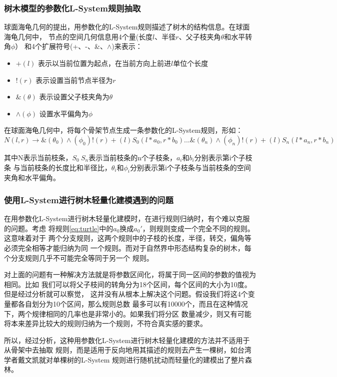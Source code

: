 \subsubsection{树木模型的参数化L-System规则抽取}
球面海龟几何的提出，用参数化的L-System规则描述了树木的结构信息。在球面海龟几何中，
节点的空间几何信息用4个量(长度$l$、半径$r$、父子枝夹角$\theta$和水平转角$\phi$）
和4个扩展符号(+、-、\&、$\wedge$)来表示：
\begin{itemize}
	\item $+(l)$	表示以当前位置为起点，在当前方向上前进$l$单位个长度
	\item $!(r)$	表示设置当前节点半径为$r$
	\item $\&(\theta)$	表示设置父子枝夹角为$\theta$
	\item $\wedge(\phi)$	设置水平偏角为$\phi$
\end{itemize}
在球面海龟几何中，将每个骨架节点生成一条参数化的L-System规则，形如：\\
\begin{equation} \label{eq:turtle}
N(l,r) \rightarrow \&(\theta_0)\wedge(\phi_0)!(r) + (l)S_0(l*a_0,r*b_0)...\&(\theta_n)\wedge(\phi_n)!(r) + (l)S_n(l*a_n,r*b_n)
\end{equation}

其中N表示当前枝条，$S_0~S_n$表示当前枝条的n个子枝条，$a_i和b_i$分别表示第i个子枝条
与当前枝条的长度比和半径比，$\theta_i和\phi_i$分别表示第i个子枝条与当前枝条的空间
夹角和水平偏角。

\subsubsection{使用L-System进行树木轻量化建模遇到的问题}
在用参数化L-System进行树木轻量化建模时，在进行规则归纳时，有个难以克服的问题。考虑
将规则\ref{eq:turtle}中的$a_0$换成$a_0'$，则规则变成一个完全不同的规则。这意味着对于
两个分支规则，这两个规则中的子枝的长度，半径，转交，偏角等必须完全相等才能归纳为同
一个规则。而对于自然界中形态结构复杂的树木，每个分支规则几乎不可能完全等同于另一个
规则。

对上面的问题有一种解决方法就是将参数区间化，将属于同一区间的参数的值视为相同。比如
我们可以将父子枝间的转角分为18个区间，每个区间的大小为10度。但是经过分析就可以察觉，
这并没有从根本上解决这个问题。假设我们将这4个变量都各自划分为10个区间，那么规则总数
最多可以有10000个，而且在这种情况下，两个规律相同的几率也是非常小的。如果我们将分区
数量减少，则又有可能将本来差异比较大的规则归纳为一个规则，不符合真实感的要求。

所以，经过分析，这种用参数化L-System进行树木轻量化建模的方法并不适用于从骨架中去抽取
规则，而是适用于反向地用其描述的规则去产生一棵树，如台湾学者戴文凯就对单棵树的L-System
规则进行随机扰动而轻量化的建模出了整片森林。

